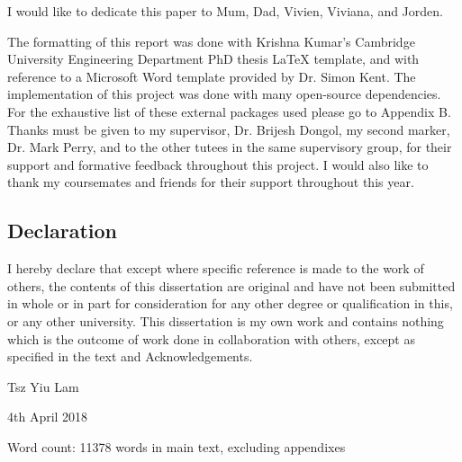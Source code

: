 
\begin{acknowledgements}      

\begin{center}
I would like to dedicate this paper to Mum, Dad, Vivien, Viviana, and Jorden.\\
\end{center}

The formatting of this report was done with Krishna Kumar's Cambridge University Engineering Department PhD thesis 
LaTeX template, and with reference to a Microsoft Word template provided by Dr. Simon Kent. 
The implementation of this project was done with many open-source dependencies.
For the exhaustive list of these external packages used please go to Appendix B.\\

Thanks must be given to my supervisor, Dr. Brijesh Dongol, my second marker, Dr. Mark Perry, 
and to the other tutees in the same supervisory group, for their support and 
formative feedback throughout this project. 
I would also like to thank my coursemates and friends for their support throughout this year.\\

\begin{center}
\section*{Declaration}
\end{center}
\vspace{1cm}
I hereby declare that except where specific reference is made to the work of 
others, the contents of this dissertation are original and have not been 
submitted in whole or in part for consideration for any other degree or 
qualification in this, or any other university. This dissertation is my own 
work and contains nothing which is the outcome of work done in collaboration 
with others, except as specified in the text and Acknowledgements.

\begin{flushright}
Tsz Yiu Lam

4th April 2018
\end{flushright}
\vspace{1cm}
\begin{center}
Word count: 11378 words in main text, excluding appendixes
\end{center}
\end{acknowledgements}
